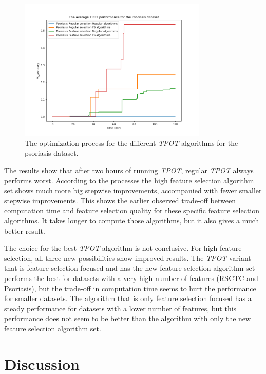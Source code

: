 \documentclass[10pt,a4paper]{report}
\begin{document}
	\begin{figure}[H]
		\centering
		\includegraphics[width=0.8\textwidth]{TPOT_avg_Psoriasis.PNG}
		\caption{The optimization process for the different \textit{TPOT} algorithms for the psoriasis dataset.}
		\label{fig:TPOTResultPsoriasis}
	\end{figure}
	
	The results show that after two hours of running \textit{TPOT}, regular \textit{TPOT} always performs worst. According to the processes the high feature selection algorithm set shows much more big stepwise improvements, accompanied with fewer smaller stepwise improvements. This shows the earlier observed trade-off between computation time and feature selection quality for these specific feature selection algorithms. It takes longer to compute those algorithms, but it also gives a much better result. 
	
	The choice for the best \textit{TPOT} algorithm is not conclusive. For high feature selection, all three new possibilities show improved results. The \textit{TPOT} variant that is feature selection focused and has the new feature selection algorithm set performs the best for datasets with a very high number of features (RSCTC and Psoriasis), but the trade-off in computation time seems to hurt the performance for smaller datasets. The algorithm that is only feature selection focused has a steady performance for datasets with a lower number of features, but this performance does not seem to be better than the algorithm with only the new feature selection algorithm set.
	
	\newpage
	\section{Discussion}
	\label{FSsec:Discussion}
	
\end{document}
